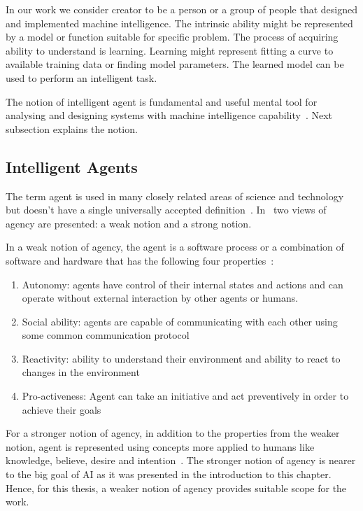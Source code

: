\documentclass[english, 12pt, a4paper, elec, utf8, online]{aaltothesis}
\begin{document}
In our work we consider creator to be a person or a group of people that designed and implemented machine intelligence. The intrinsic ability might be represented by a model or function suitable for specific problem. The process of acquiring ability to understand is learning. Learning might represent fitting a curve to available training data or finding model parameters. The learned model can be used to perform an intelligent task. 

The notion of intelligent agent is fundamental and useful mental tool for analysing and designing systems with machine intelligence capability~\cite{AIMA}. Next subsection explains the notion.    

\subsection{Intelligent Agents}
The term agent is used in many closely related areas of science and technology but doesn't have a single universally accepted definition~\cite{wooldridge_jennings94}. In~\cite{wooldridge_jennings94} two views of agency are presented: a weak notion and a strong notion.

In a weak notion of agency, the agent is a software process or a combination of software and hardware that has the following four properties~\cite{wooldridge_jennings94}:

\begin{enumerate}
\item
Autonomy: agents have control of their internal states and actions and can operate without external interaction by other agents or humans.
\item
Social ability: agents are capable of communicating with each other using some common communication protocol 
\item
Reactivity: ability to understand their environment and ability to react to changes in the environment
\item
Pro-activeness: Agent can take an initiative and act preventively in order to achieve their goals
\end{enumerate}

For a stronger notion of agency, in addition to the properties from the weaker notion, agent is represented using concepts more applied to humans like knowledge, believe, desire and intention~\cite{wooldridge_jennings94}. The stronger notion of agency is nearer to the big goal of AI as it was presented in the introduction to this chapter. Hence, for this thesis, a weaker notion of agency provides suitable scope for the work.
\end{document}
